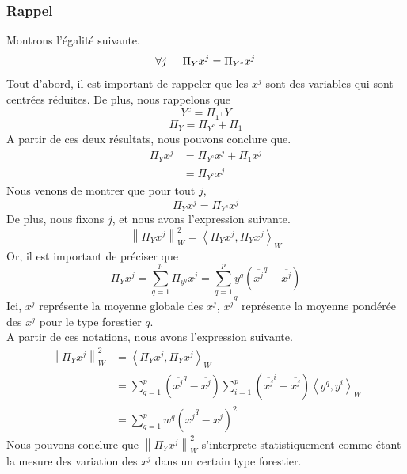 \documentclass{article}
\begin{document}
\subsubsection{Rappel}
Montrons l'égalité suivante. \\
\[
\forall j \hspace{0.5cm} \Pi_Y x^j = \Pi_{Y^c} x^j
\]
Tout d'abord, il est important de rappeler que les $x^j$ sont des variables qui sont
centrées réduites. De plus, nous rappelons que 
\[
Y^c = \Pi_{1^\perp} Y 
\]
\[
\Pi_Y = \Pi_{Y^c} + \Pi_1
\]
A partir de ces deux résultats, nous pouvons conclure que. \\
\begin{align*}
    \Pi_Y x^j & = \Pi_{Y^c} x^j + \Pi_1 x^j \\
    &= \Pi_{Y^c} x^j
\end{align*}
Nous venons de montrer que pour tout $j$, 
\[
\Pi_Y x^j = \Pi_{Y^c} x^j
\]
De plus, nous fixons $j$, et nous avons l'expression suivante.
\[
\left\lVert \Pi_Y x^j \right\rVert^2 _W = \left\langle \Pi_Y x^j,\Pi_Y x^j\right\rangle_W
\]
Or, il est important de préciser que
\[
\Pi_Y x^j=\sum_{q = 1}^{p}\Pi_{y^q} x^j=\sum_{q = 1}^{p}y^q( \overline{x^j}^q - {\overline{x^j}} )  
\]
Ici, $\overline{x^j}$ représente la moyenne globale des $x^j$, $\overline{x^j}^q$ représente la moyenne pondérée des $x^j$ pour le type forestier $q$.\\
A partir de ces notations, nous avons l'expression suivante.
\begin{align*}
    \left\lVert \Pi_Y x^j \right\rVert^2 _W &= \left\langle \Pi_Y x^j,\Pi_Y x^j\right\rangle_W \\
     &=  \sum_{q = 1}^{p}( \overline{x^j}^q - {\overline{x^j}} ) \sum_{ i= 1}^{p}( \overline{x^j}^i - {\overline{x^j}} )\left\langle y^q,y^i\right\rangle_W \\
     &= \sum_{q = 1}^{p}w^q( \overline{x^j}^q - {\overline{x^j}} )^2
\end{align*}
Nous pouvons conclure que $\left\lVert \Pi_Y x^j \right\rVert^2 _W$ s'interprete statistiquement comme
étant la mesure des variation des $x^j$ dans un certain type forestier.
\\
\\
\end{document}
